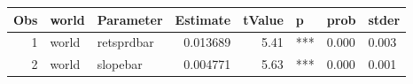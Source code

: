 

\begin{longtable}{|r|l|l|r|r|l|l|l|}\hline
   Obs &    world &    Parameter &    Estimate &    tValue &    p &    prob &    stder\\\hline
\endhead
   1 &    world &    retsprdbar &    0.013689 &    5.41 &    *** &    0.000 &    0.003\\\hline
   2 &    world &    slopebar &    0.004771 &    5.63 &    *** &    0.000 &    0.001\\\hline
\end{longtable}

